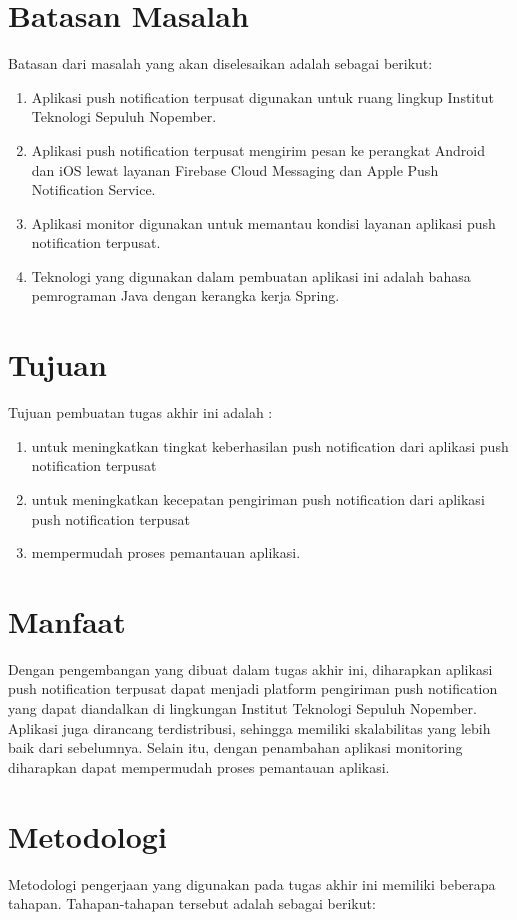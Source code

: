 \section {Batasan Masalah}
Batasan dari masalah yang akan diselesaikan adalah sebagai berikut:
\begin {enumerate}
\item Aplikasi push notification terpusat digunakan untuk ruang lingkup Institut Teknologi Sepuluh Nopember.
\item Aplikasi push notification terpusat mengirim pesan ke perangkat Android dan iOS lewat layanan Firebase Cloud Messaging dan Apple Push Notification Service.
\item Aplikasi monitor digunakan untuk memantau kondisi layanan aplikasi push notification terpusat.
\item Teknologi yang digunakan dalam pembuatan aplikasi ini adalah bahasa pemrograman Java dengan kerangka kerja Spring.
\end {enumerate}

\section {Tujuan}
Tujuan pembuatan tugas akhir ini adalah :
\begin{enumerate}
	\item untuk meningkatkan tingkat keberhasilan push notification dari aplikasi push notification terpusat
	\item untuk meningkatkan kecepatan pengiriman push notification dari aplikasi push notification terpusat 
	\item mempermudah proses pemantauan aplikasi.
\end{enumerate}

\section{Manfaat}
Dengan pengembangan yang dibuat dalam tugas akhir ini, diharapkan aplikasi push notification terpusat dapat menjadi platform pengiriman push notification yang dapat diandalkan di lingkungan Institut Teknologi Sepuluh Nopember. Aplikasi juga dirancang terdistribusi, sehingga memiliki skalabilitas yang lebih baik dari sebelumnya. Selain itu, dengan penambahan aplikasi monitoring diharapkan dapat mempermudah proses pemantauan aplikasi.

\section {Metodologi}
Metodologi pengerjaan yang digunakan pada tugas akhir ini memiliki beberapa tahapan. Tahapan-tahapan tersebut adalah sebagai berikut:

